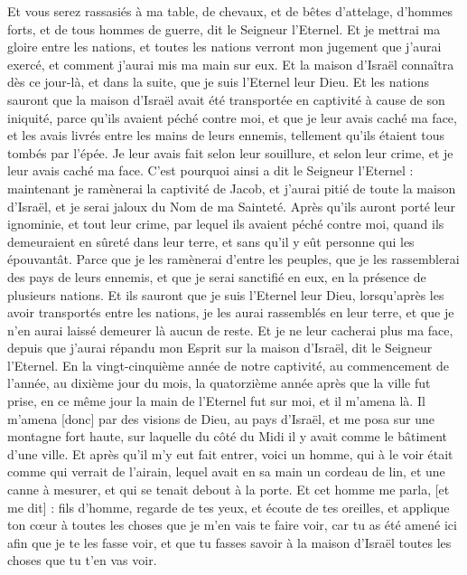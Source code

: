 \begin{multicols}{2}
Et vous serez rassasiés à ma table, de chevaux, et de bêtes d'attelage, d'hommes forts, et de tous hommes de guerre, dit le Seigneur l'Eternel.
Et je mettrai ma gloire entre les nations, et toutes les nations verront mon jugement que j'aurai exercé, et comment j'aurai mis ma main sur eux.
Et la maison d'Israël connaîtra dès ce jour-là, et dans la suite, que je suis l'Eternel leur Dieu.
Et les nations sauront que la maison d'Israël avait été transportée en captivité à cause de son iniquité, parce qu'ils avaient péché contre moi, et que je leur avais caché ma face, et les avais livrés entre les mains de leurs ennemis, tellement qu'ils étaient tous tombés par l'épée.
Je leur avais fait selon leur souillure, et selon leur crime, et je leur avais caché ma face.
C'est pourquoi ainsi a dit le Seigneur l'Eternel : maintenant je ramènerai la captivité de Jacob, et j'aurai pitié de toute la maison d'Israël, et je serai jaloux du Nom de ma Sainteté.
Après qu'ils auront porté leur ignominie, et tout leur crime, par lequel ils avaient péché contre moi, quand ils demeuraient en sûreté dans leur terre, et sans qu'il y eût personne qui les épouvantât.
Parce que je les ramènerai d'entre les peuples, que je les rassemblerai des pays de leurs ennemis, et que je serai sanctifié en eux, en la présence de plusieurs nations.
Et ils sauront que je suis l'Eternel leur Dieu, lorsqu'après les avoir transportés entre les nations, je les aurai rassemblés en leur terre, et que je n'en aurai laissé demeurer là aucun de reste.
Et je ne leur cacherai plus ma face, depuis que j'aurai répandu mon Esprit sur la maison d'Israël, dit le Seigneur l'Eternel.
\VerseOne{}En la vingt-cinquième année de notre captivité, au commencement de l'année, au dixième jour du mois, la quatorzième année après que la ville fut prise, en ce même jour la main de l'Eternel fut sur moi, et il m'amena là.
Il m'amena [donc] par des visions de Dieu, au pays d'Israël, et me posa sur une montagne fort haute, sur laquelle du côté du Midi il y avait comme le bâtiment d'une ville.
Et après qu'il m'y eut fait entrer, voici un homme, qui à le voir était comme qui verrait de l'airain, lequel avait en sa main un cordeau de lin, et une canne à mesurer, et qui se tenait debout à la porte.
Et cet homme me parla, [et me dit] : fils d'homme, regarde de tes yeux, et écoute de tes oreilles, et applique ton cœur à toutes les choses que je m'en vais te faire voir, car tu as été amené ici afin que je te les fasse voir, et que tu fasses savoir à la maison d'Israël toutes les choses que tu t'en vas voir.

\end{multicols}
